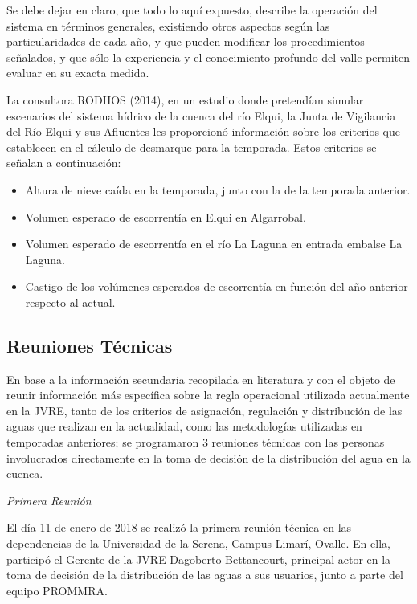 \documentclass[11pt,]{article}
\begin{document}
Se debe dejar en claro, que todo lo aquí expuesto, describe la operación del sistema en términos generales, existiendo otros aspectos según las particularidades de cada año, y que pueden modificar los procedimientos señalados, y que sólo la experiencia y el conocimiento profundo del valle permiten evaluar en su exacta medida.\bigskip

La consultora RODHOS (2014), en un estudio donde pretendían simular escenarios del sistema hídrico de la cuenca del río Elqui, la Junta de Vigilancia del Río Elqui y sus Afluentes les proporcionó información sobre los criterios que establecen en el cálculo de desmarque para la temporada. Estos criterios se señalan a continuación:\bigskip
		
		\begin{itemize}
		
		\item Altura de nieve caída en la temporada, junto con la de la temporada anterior.
		\item Volumen esperado de escorrentía en Elqui en Algarrobal.
		\item Volumen esperado de escorrentía en el río La Laguna en entrada embalse La Laguna.
		\item Castigo de los volúmenes esperados de escorrentía en función del año anterior respecto al actual.
		
		\end{itemize}
		
		\subsection{Reuniones Técnicas}
		
		En base a la información secundaria recopilada en literatura y con el objeto de reunir información más específica sobre la regla operacional utilizada actualmente en la JVRE, tanto de los criterios de asignación, regulación y distribución de las aguas que realizan en la actualidad, como las metodologías utilizadas en temporadas anteriores; se programaron 3 reuniones técnicas con las personas involucrados directamente en la toma de decisión de la distribución del agua en la cuenca. \bigskip
		
		\textit {Primera Reunión}\bigskip
		
		
		El día 11 de enero de 2018 se realizó la primera reunión técnica en las dependencias de la Universidad de la Serena, Campus Limarí, Ovalle. En ella, participó el Gerente de la JVRE Dagoberto Bettancourt, principal actor en la toma de decisión de la distribución de las aguas a sus usuarios, junto a parte del equipo PROMMRA.\bigskip
		
\end{document}
